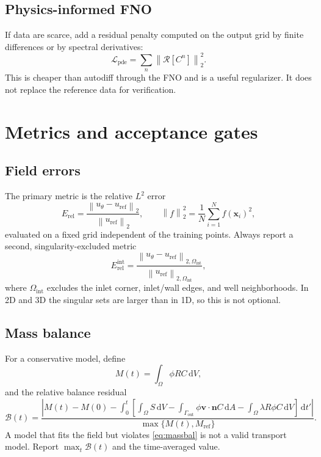 \documentclass[11pt]{article}
\newcommand{\LL}{\mathcal{L}}
\newcommand{\RR}{\mathcal{R}}
\newcommand{\vv}{\mathbf{v}}
\newcommand{\xx}{\mathbf{x}}
\newcommand{\nn}{\mathbf{n}}
\newcommand{\norm}[1]{\left\lVert #1 \right\rVert}
\newcommand{\intO}{\int_{\Omega}}
\newcommand{\intG}{\int_{\Gamma_{\mathrm{out}}}}
\newcommand{\dd}{\,\mathrm{d}}
\begin{document}
\subsection{Physics-informed FNO}

If data are scarce, add a residual penalty computed on the output grid by
finite differences or by spectral derivatives:
\begin{equation}
\label{eq:fnopde}
\LL_{\mathrm{pde}}=\sum_{n}\norm{\RR[C^n]}_2^2 .
\end{equation}
This is cheaper than autodiff through the FNO and is a useful regularizer.
It does not replace the reference data for verification.

\section{Metrics and acceptance gates}
\label{sec:gates}

\subsection{Field errors}

The primary metric is the relative $L^2$ error
\begin{equation}
\label{eq:relL2}
E_{\mathrm{rel}}=\frac{\norm{u_\theta-u_{\mathrm{ref}}}_2}
{\norm{u_{\mathrm{ref}}}_2},
\qquad
\norm{f}_2^2=\frac1{N}\sum_{i=1}^{N}f(\xx_i)^2,
\end{equation}
evaluated on a fixed grid independent of the training points.  Always report a
second, singularity-excluded metric
\begin{equation}
\label{eq:relL2int}
E_{\mathrm{rel}}^{\mathrm{int}}
=\frac{\norm{u_\theta-u_{\mathrm{ref}}}_{2,\Omega_{\mathrm{int}}}}
{\norm{u_{\mathrm{ref}}}_{2,\Omega_{\mathrm{int}}}},
\end{equation}
where $\Omega_{\mathrm{int}}$ excludes the inlet corner, inlet/wall edges, and
well neighborhoods.  In 2D and 3D the singular sets are larger than in 1D, so
this is not optional.

\subsection{Mass balance}

For a conservative model, define
\begin{equation}
\label{eq:mass}
M(t)=\intO\phi R C\dd V,
\end{equation}
and the relative balance residual
\begin{equation}
\label{eq:massbal}
\mathcal{B}(t)=
\frac{\left|M(t)-M(0)-\int_0^t\left[
\intO S\dd V-\intG\phi\vv\cdot\nn C\dd A
-\intO\lambda R\phi C\dd V\right]\dd t'\right|}
{\max\{M(t),M_{\mathrm{ref}}\}}.
\end{equation}
A model that fits the field but violates \eqref{eq:massbal} is not a valid
transport model.  Report $\max_t\mathcal{B}(t)$ and the time-averaged value.
\end{document}
